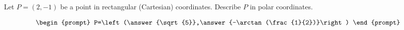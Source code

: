 \documentclass{ximera}
\author{Gregory Hartman \and Matthew Carr}
\begin{document}
\begin{exercise}





Let $P=(2,-1)$ be a point in rectangular (Cartesian) coordinates. Describe $P$ in polar coordinates.

\[
\begin{prompt}
P=\left(\answer{\sqrt{5}},\answer{-\arctan(\frac{1}{2})}\right)
\end{prompt}
\]

\end{exercise}
\end{document}
